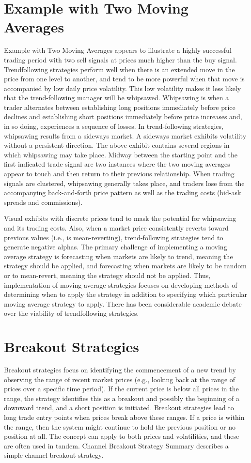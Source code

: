 \documentclass[11pt]{article}
\begin{document}
\section*{Example with Two Moving Averages}
Example with Two Moving Averages appears to illustrate a highly successful trading period with two sell signals at prices much higher than the buy signal. Trendfollowing strategies perform well when there is an extended move in the price from one level to another, and tend to be more powerful when that move is accompanied by low daily price volatility. This low volatility makes it less likely that the trend-following manager will be whipsawed. Whipsawing is when a trader alternates between establishing long positions immediately before price declines and establishing short positions immediately before price increases and, in so doing, experiences a sequence of losses. In trend-following strategies, whipsawing results from a sideways market. A sideways market exhibits volatility without a persistent direction. The above exhibit contains several regions in which whipsawing may take place. Midway between the starting point and the first indicated trade signal are two instances where the two moving averages appear to touch and then return to their previous relationship. When trading signals are clustered, whipsawing generally takes place, and traders lose from the accompanying back-and-forth price pattern as well as the trading costs (bid-ask spreads and commissions).

Visual exhibits with discrete prices tend to mask the potential for whipsawing and its trading costs. Also, when a market price consistently reverts toward previous values (i.e., is mean-reverting), trend-following strategies tend to generate negative alphas. The primary challenge of implementing a moving average strategy is forecasting when markets are likely to trend, meaning the strategy should be applied, and forecasting when markets are likely to be random or to mean-revert, meaning the strategy should not be applied. Thus, implementation of moving average strategies focuses on developing methods of determining when to apply the strategy in addition to specifying which particular moving average strategy to apply. There has been considerable academic debate over the viability of trendfollowing strategies.

\section*{Breakout Strategies}
Breakout strategies focus on identifying the commencement of a new trend by observing the range of recent market prices (e.g., looking back at the range of prices over a specific time period). If the current price is below all prices in the range, the strategy identifies this as a breakout and possibly the beginning of a downward trend, and a short position is initiated. Breakout strategies lead to long trade entry points when prices break above these ranges. If a price is within the range, then the system might continue to hold the previous position or no position at all. The concept can apply to both prices and volatilities, and these are often used in tandem. Channel Breakout Strategy Summary describes a simple channel breakout strategy.
\end{document}
